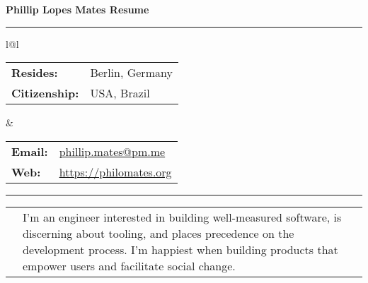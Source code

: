 \documentclass[10pt]{article}
\makeatletter
\newcommand{\category}[2]{
\begin{center}
\vskip 6pt
\begin{tabular*}{\textwidth}{@{}p{0.75in}@{\quad\;\;}p{4in}@{\quad\quad}p{0.7in}}
\vcrush[t]{1in}{\textsc{#1}} &
#2
\end{tabular*}
\end{center}
}
\makeatother
\begin{document}

{\LARGE \bf \sc
\noindent Phillip Lopes Mates\hspace{\stretch 1}
Resume
}
\vskip 10pt
\hrule


\begin{center}
\vskip -5pt
\begin{tabular*}{\textwidth}{l@{\extracolsep{\fill}}l}

\begin{tabular}[t]{ll}
{\small\bf Resides:} & {\small Berlin, Germany} \\
{\small\bf Citizenship:} & {\small USA, Brazil}

\end{tabular} &

\begin{tabular}[t]{ll}
{\small\bf Email:} & {\small \url{phillip.mates@pm.me}}\\
{\small\bf Web:} & {\small \url{https://philomates.org}}\\
\end{tabular}

\end{tabular*}
\end{center}

\vskip -6pt
\hrule


\category{Statement}{
I'm an engineer interested in building well-measured software, is discerning about tooling, and places precedence on the development process. I’m happiest when building products that empower users and facilitate social change.
}

\end{document}
